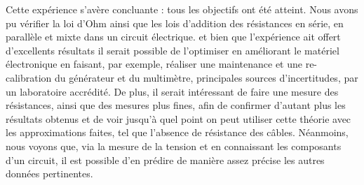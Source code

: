\documentclass[11pt]{article}
\begin{document}
Cette expérience s'avère concluante : tous les objectifs ont été atteint. Nous avons pu vérifier la loi d'Ohm ainsi que les lois d’addition des résistances en série, en parallèle et mixte dans un circuit électrique. et bien que l'expérience ait offert d'excellents résultats il serait possible de l'optimiser en améliorant le matériel électronique en faisant, par exemple, réaliser une maintenance et une re-calibration du générateur et du multimètre, principales sources d'incertitudes, par un laboratoire accrédité. De plus, il serait intéressant de faire une mesure des résistances, ainsi que des mesures plus fines, afin de confirmer d'autant plus les résultats obtenus et de voir jusqu'à quel point on peut utiliser cette théorie avec les approximations faites, tel que l'absence de résistance des câbles. Néanmoins, nous voyons que, via la mesure de la tension et en connaissant les composants d'un circuit, il est possible d'en prédire de manière assez précise les autres données pertinentes.
\end{document}
